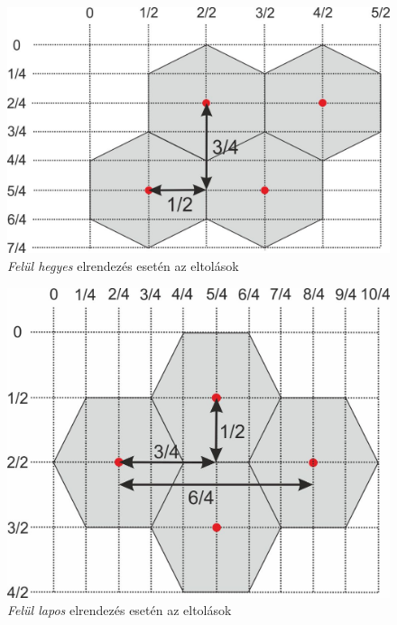 \begin{figure}[h!]
\centering
\includegraphics[scale=1.0]{kepek/PointyTop.jpg}
\caption{\textit{Felül hegyes} elrendezés esetén az eltolások}
\label{fig:PointyTop}
\end{figure}

\begin{figure}[h!]
\centering
\includegraphics[scale=1.0]{kepek/FlatTop.jpg}
\caption{\textit{Felül lapos} elrendezés esetén az eltolások}
\label{fig:FlatTop}
\end{figure}


